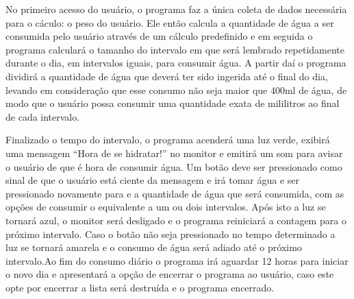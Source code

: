 \documentclass[a4paper]{article}
\begin{document}
No primeiro acesso do usuário, o programa faz a única coleta de dados necessária para o cáculo: o peso do usuário. Ele então calcula a quantidade de água a ser consumida pelo usuário através de um cálculo predefinido e em seguida o programa calculará o tamanho do intervalo em que será lembrado repetidamente durante o dia, em intervalos iguais, para consumir água. A partir daí o programa dividirá a quantidade de água que deverá ter sido ingerida até o final do dia, levando em consideração que esse consumo não seja maior que 400ml de água, de modo que o usuário possa consumir uma quantidade exata de mililitros ao final de cada intervalo.


Finalizado o tempo do intervalo, o programa acenderá uma luz verde, exibirá uma mensagem “Hora de se hidratar!” no monitor e emitirá um som para avisar o usuário de que é hora de consumir água. Um botão deve ser pressionado como sinal de que o usuário está ciente da mensagem e irá tomar água e ser pressionado novamente para e a quantidade de água que será consumida, com as opções de consumir o equivalente a um ou dois intervalos. Após isto a luz se tornará azul, o monitor será desligado e o programa reiniciará a contagem para o próximo intervalo. Caso o botão não seja pressionado no tempo determinado a luz se tornará amarela e o consumo de água será adiado até o próximo intervalo.Ao fim do consumo diário o programa irá aguardar 12 horas para iniciar o novo dia e apresentará a opção de encerrar o programa ao usuário, caso este opte por encerrar a lista será destruída e o programa encerrado.
\end{document}
